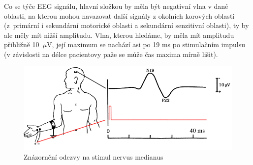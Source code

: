 Co se týče EEG signálu, hlavní složkou by měla být negativní vlna v dané oblasti, na kterou mohou navazovat další signály z okolních korových oblastí (z~primární i sekundární motorické oblasti a sekundární senzitivní oblasti), ty by ale měly mít nižší amplitudu. Vlna, kterou hledáme, by měla mít amplitudu přibližně 10~$\mu$V, její maximum se nachází asi po 19 ms po stimulačním impulsu (v závislosti na délce pacientovy paže se může čas maxima mírně lišit). \cite{68}

\begin{figure}[!h]
\includegraphics[scale=0.5]{casti/aplikace/sep/odezva.jpg}
\caption{Znázornění odezvy na stimul nervus medianus}
\end{figure}

